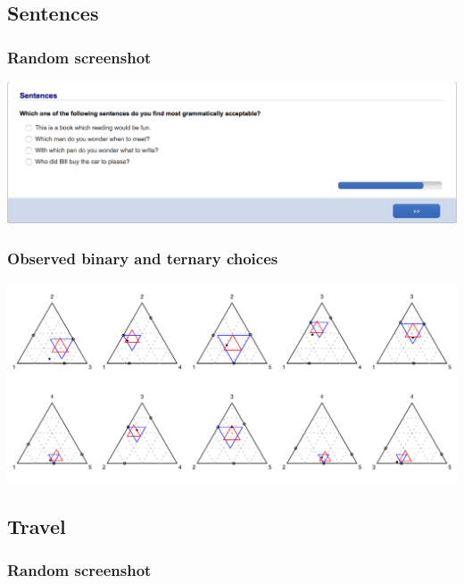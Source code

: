 \documentclass[11pt,letter]{article}
\begin{document}
\pagebreak

\subsection{Sentences}



\subsubsection*{Random screenshot}

\includegraphics[width=15cm]{Population_study_design/screenshot_Sentences.png}

\subsubsection*{Observed binary and ternary choices}

\includegraphics[width=15cm]{./Population_study_data/Simplexes/Sentences.pdf}

\pagebreak

\subsection{Travel}



\subsubsection*{Random screenshot}
\end{document}
